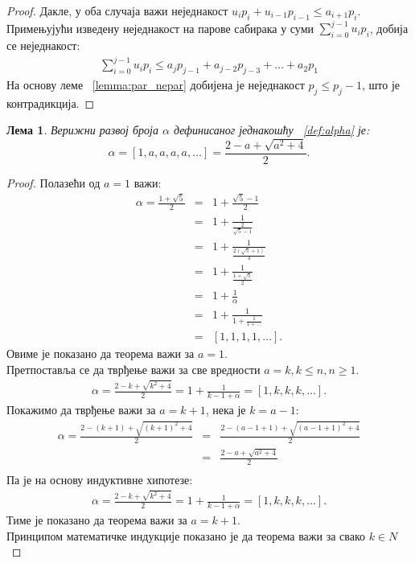 \documentclass[a4paper]{article}
\newtheorem{lemma}{Лема}
\begin{document}
\begin{proof}
	Дакле, у оба случаја важи неједнакост $ u_{i}p_{i}+u_{i-1}p_{i-1} \le a_{i+1}p_{i}$.\\
	Примењујући изведену неједнакост на парове сабирака у суми $ \sum_{i=0}^{j-1} u_{i}p_{i} $, добија се неједнакост:
	\begin{eqnarray*}
		\sum_{i=0}^{j-1} u_{i}p_{i} \leq a_{j}p_{j-1} + a_{j-2}p_{j-3} + \ldots + a_{2}p_{1}
	\end{eqnarray*}
	На основу леме ~\ref{lemma:par_nepar} добијена је неједнакост $ p_{j} \leq p_{j} - 1 $, што је контрадикција.
	
\end{proof}

\begin{lemma}
	Верижни развој броја $ \alpha $ дефинисаног једнакошћу ~\eqref{def:alpha} је:
	\begin{displaymath}
	\alpha = [1 ,a, a, a, a, \ldots] = \frac{2 - a + \sqrt{a^2 + 4}}{2}.
	\end{displaymath}  
\end{lemma}

\begin{proof}
	Полазећи од $ a = 1 $ важи:	
		\begin{eqnarray*}
			\alpha = \frac{1+\sqrt 5}{2} &=& 1 + \frac{\sqrt 5 - 1}{2}\\
										 &=& 1 + \frac{1}{\frac{2}{\sqrt 5 - 1}}\\
										 &=& 1 + \frac{1}{\frac{2(\sqrt 5 + 1)}{4}}\\
										 &=& 1 + \frac{1}{\frac{1 + \sqrt 5}{2}}\\
										 &=& 1 + \frac{1}{\alpha}\\
										 &=& 1 + \frac{1}{1 + \frac{1}{1 + \ldots}}\\
										 &=& [1, 1, 1, 1, \ldots].
		\end{eqnarray*}
	Овиме је показано да теорема важи за $ a = 1 $.\\
	Претпоставља се да тврђење важи за све вредности $ a = k, k \leq n, n \geq 1 $. 	
		\begin{eqnarray*}
			\alpha = \frac{2 - k + \sqrt{k^2+4}}{2} = 1 + \frac{1}{k-1+\alpha} = [1, k, k, k, \ldots].
		\end{eqnarray*}
	Покажимо да тврђење важи за $ a = k + 1 $, нека је $ k = a - 1 $:	
		\begin{eqnarray*}
			\alpha = \frac{2 - (k + 1) + \sqrt{(k + 1)^2 + 4}}{2} &=& \frac{2 - (a - 1 + 1) + \sqrt{(a - 1 + 1)^2 + 4}}{2}\\
																  &=& \frac{2 - a + \sqrt{a^2 + 4}}{2}\\
		\end{eqnarray*}
	Па је на основу индуктивне хипотезе:
		\begin{eqnarray*}
			\alpha = \frac{2 - k + \sqrt{k^2+4}}{2} = 1 + \frac{1}{k-1+\alpha} = [1, k, k, k, \ldots].
		\end{eqnarray*}
	Тиме је показано да теорема важи за $ a = k + 1 $. \\	
	Принципом математичке индукције показано је да теорема важи за свако $ k \in N $
\end{proof}
\end{document}
